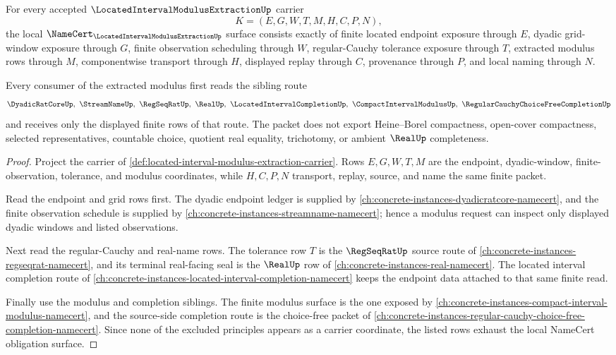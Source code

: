 \begin{theorem}
\label{thm:located-interval-modulus-extraction-obligations}
For every accepted $\LocatedIntervalModulusExtractionUp$ carrier
$$
K=(E,G,W,T,M,H,C,P,N),
$$
the local $\NameCert_{\LocatedIntervalModulusExtractionUp}$ surface consists exactly of finite located endpoint exposure through $E$, dyadic grid-window exposure through $G$, finite observation scheduling through $W$, regular-Cauchy tolerance exposure through $T$, extracted modulus rows through $M$, componentwise transport through $H$, displayed replay through $C$, provenance through $P$, and local naming through $N$.

Every consumer of the extracted modulus first reads the sibling route
$$
\DyadicRatCoreUp,\ \StreamNameUp,\ \RegSeqRatUp,\ \RealUp,\ \LocatedIntervalCompletionUp,\ \CompactIntervalModulusUp,\ \RegularCauchyChoiceFreeCompletionUp
$$
and receives only the displayed finite rows of that route. The packet does not export Heine--Borel compactness, open-cover compactness, selected representatives, countable choice, quotient real equality, trichotomy, or ambient $\RealUp$ completeness.
\end{theorem}
\begin{proof}
Project the carrier of \autoref{def:located-interval-modulus-extraction-carrier}. Rows $E,G,W,T,M$ are the endpoint, dyadic-window, finite-observation, tolerance, and modulus coordinates, while $H,C,P,N$ transport, replay, source, and name the same finite packet.

Read the endpoint and grid rows first. The dyadic endpoint ledger is supplied by \autoref{ch:concrete-instances-dyadicratcore-namecert}, and the finite observation schedule is supplied by \autoref{ch:concrete-instances-streamname-namecert}; hence a modulus request can inspect only displayed dyadic windows and listed observations.

Next read the regular-Cauchy and real-name rows. The tolerance row $T$ is the $\RegSeqRatUp$ source route of \autoref{ch:concrete-instances-regseqrat-namecert}, and its terminal real-facing seal is the $\RealUp$ row of \autoref{ch:concrete-instances-real-namecert}. The located interval completion route of \autoref{ch:concrete-instances-located-interval-completion-namecert} keeps the endpoint data attached to that same finite read.

Finally use the modulus and completion siblings. The finite modulus surface is the one exposed by \autoref{ch:concrete-instances-compact-interval-modulus-namecert}, and the source-side completion route is the choice-free packet of \autoref{ch:concrete-instances-regular-cauchy-choice-free-completion-namecert}. Since none of the excluded principles appears as a carrier coordinate, the listed rows exhaust the local NameCert obligation surface.
\end{proof}

